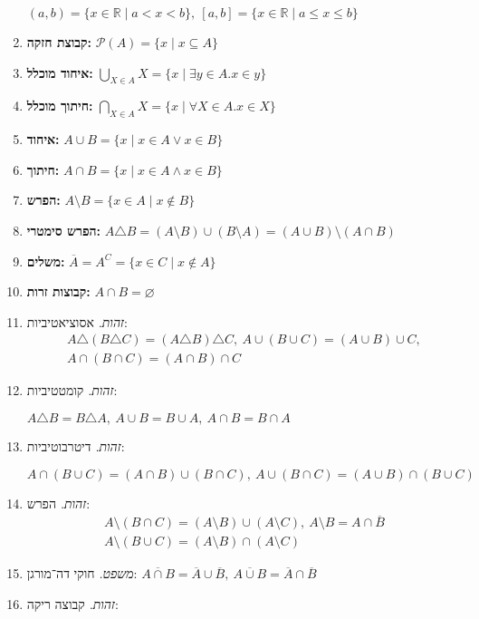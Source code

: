 \documentclass[]{article}
\newcommand\R     {\mathbb{R}}
\newcommand\ps    {\mathcal{P}}
\newcommand\trio  {\triangle}
\newcommand\ol    {\overline}
\newcommand\ax[1]     {\color{blue}#1\color{black}}
\newcommand\tho       {\textit{משפט. }}
\newcommand\id        {\textit{זהות. }}
\begin{document}
\begin{multicols}{2}
\begin{enumerate}
				\hfill$(a, b) = \{x \in \R \mid a < x < b\}, \ [a, b] = \{x \in \R \mid a \le x \le b\}$ 
			\item \ax{\textbf{קבוצת חזקה: }} \hfill$\ps(A) = \{x \mid x \subseteq A\}$
			\item \ax{\textbf{איחוד מוכלל: }} \hfill$\bigcup_{X \in A}X =  \{x \mid \exists y \in A. x \in y\}$
			\item \textbf{חיתוך מוכלל: } \hfill$\bigcap_{X \in A}X = \{x \mid \forall X \in A. x \in X\}$
			\item \textbf{איחוד: }\hfill$A \cup B = \{x \mid x \in A \lor x \in B\}$
			\item \textbf{חיתוך: }\hfill$A \cap B = \{x \mid x \in A \land x \in B\}$
			\item \textbf{הפרש: }\hfill$A \setminus B = \{x \in A \mid x \notin B\}$
			\item \textbf{הפרש סימטרי: }\hfill$A \trio B = (A \setminus B) \cup (B \setminus A) = (A \cup B) \setminus (A \cap B)$
			\item \textbf{משלים: }\hfill$\ol A = A^{C} = \{x \in C \mid x \notin A\}$
			\item \textbf{קבוצות זרות: }\hfill$A \cap B = \varnothing$
			\item \id אסוציאטיביות: 
			\begin{gather*}
				A \trio (B \trio C) = (A \trio B) \trio C, \ A \cup (B \cup C) = (A \cup B) \cup C, \\ A \cap (B \cap C) = (A \cap B) \cap C
			\end{gather*}
			\item \id קומטטיביות: 
				
				\hfill $A \trio B = B \trio A, \ A \cup B = B \cup A, \ A \cap B = B \cap A$
			\item \id דיטרבוטיביות: 
				
				\hfill$A \cap (B \cup C) = (A \cap B) \cup (B \cap C), \ A \cup (B \cap C) = (A \cup B) \cap (B \cup C) $
			\item \id הפרש: 
			\begin{gather*}
				A \setminus (B \cap C) = (A \setminus B) \cup (A \setminus C), \ A \setminus B = A \cap \ol B \\
				A \setminus (B \cup C) = (A \setminus B) \cap (A \setminus C)
			\end{gather*}
			\item \tho חוקי דה־מורגן: \hfill$\ol{A \cap B} = \ol A \cup \ol B, \ \ol{A \cup B} = \ol A \cap \ol B$
			\item \id קבוצה ריקה: 
				

\end{enumerate}
\end{multicols}
\end{document}
